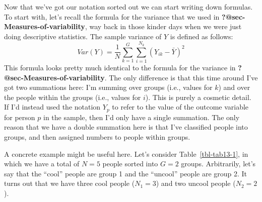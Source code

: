 \documentclass[
  a4paper,
]{book}
\begin{document}
Now that we've got our notation sorted out we can start writing down
formulas. To start with, let's recall the formula for the variance that
we used in \textbf{?@sec-Measures-of-variability}, way back in those
kinder days when we were just doing descriptive statistics. The sample
variance of \(Y\) is defined as follows:
\[Var(Y)=\frac{1}{N}\sum_{k=1}^{G}\sum_{i=1}^{N_k}(Y_{ik}-\bar{Y})^2\]
This formula looks pretty much identical to the formula for the variance
in \textbf{?@sec-Measures-of-variability}. The only difference is that
this time around I've got two summations here: I'm summing over groups
(i.e., values for \(k\)) and over the people within the groups (i.e.,
values for \(i\)). This is purely a cosmetic detail. If I'd instead used
the notation \(Y_p\) to refer to the value of the outcome variable for
person \(p\) in the sample, then I'd only have a single summation. The
only reason that we have a double summation here is that I've classified
people into groups, and then assigned numbers to people within groups.

A concrete example might be useful here. Let's consider
Table~\ref{tbl-tab13-1}, in which we have a total of \(N = 5\) people
sorted into \(G = 2\) groups. Arbitrarily, let's say that the ``cool''
people are group 1 and the ``uncool'' people are group 2. It turns out
that we have three cool people (\(N_1 = 3\)) and two uncool people
(\(N_2 = 2\)).

\hypertarget{tbl-tab13-1}{}
 
  \providecommand{\huxb}[2]{\arrayrulecolor[RGB]{#1}\global\arrayrulewidth=#2pt}
  \providecommand{\huxvb}[2]{\color[RGB]{#1}\vrule width #2pt}
  \providecommand{\huxtpad}[1]{\rule{0pt}{#1}}
  \providecommand{\huxbpad}[1]{\rule[-#1]{0pt}{#1}}
\end{document}
